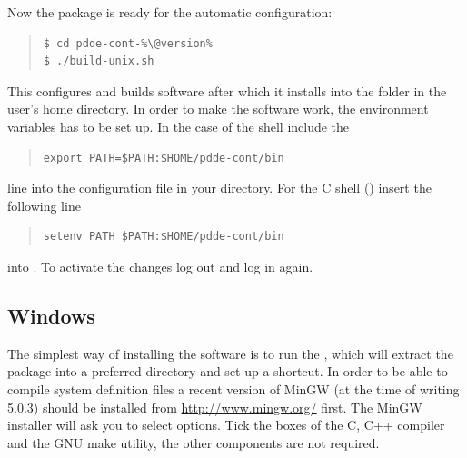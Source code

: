 \documentclass[10pt,a4paper]{ddedoc}
\begin{document}
Now the package is ready for the automatic configuration:
{ \small \begin{quote} \begin{lstlisting}[basicstyle=\tt,frame=single]
$ cd pdde-cont-%\@version%
$ ./build-unix.sh
\end{lstlisting} \end{quote} } \noindent
This configures and builds software after which it installs into the
 folder in the user's home directory.
In order to make the software work, the  environment variables has
to be set up. In the case of the  shell include the
{ \small \begin{quote} \begin{lstlisting}[basicstyle=\tt,frame=single]
export PATH=$PATH:$HOME/pdde-cont/bin
\end{lstlisting} \end{quote} } \noindent
line into the  configuration file in your 
directory. For the C shell () insert the following line
{ \small \begin{quote} \begin{lstlisting}[basicstyle=\tt,frame=single]
setenv PATH $PATH:$HOME/pdde-cont/bin
\end{lstlisting} \end{quote} } \noindent
into . To activate the changes log out and log in again.

\subsection{Windows}

The simplest way of installing the software is to run the
, which will extract the package into a
preferred directory and set up a  shortcut. In order to be
able to compile system definition files a recent version of MinGW (at the time
of writing 5.0.3) should be installed from \url{http://www.mingw.org/} first.
The MinGW installer will ask you to select options. Tick the boxes of the C, C++
compiler and the GNU make utility, the other components are not required.
\end{document}
